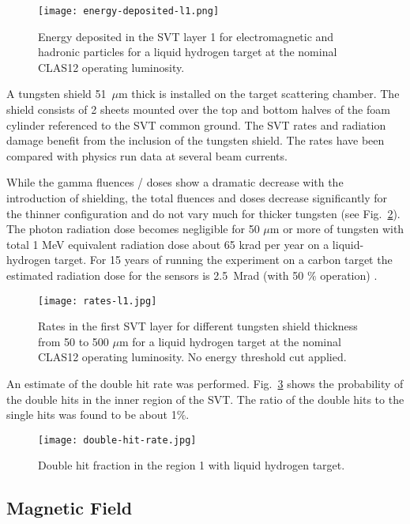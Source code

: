 \begin{figure}[hbt] 
\centering 
\texttt{[image: energy-deposited-l1.png]}
\caption{Energy deposited in the SVT layer 1 for electromagnetic and hadronic particles for a liquid hydrogen target at the nominal CLAS12 operating luminosity.}
\label{fig:energy-deposited-l1}
\end{figure}

A tungsten shield 51~$\mu$m thick is installed on the target scattering chamber. The shield consists of 2 sheets mounted over the top and bottom halves of the foam cylinder referenced to the SVT common ground. The SVT rates and radiation damage benefit from the inclusion of the tungsten shield. The rates have been compared with physics run data at several beam currents.

While the gamma fluences / doses show a dramatic decrease with the introduction of shielding, the total fluences and doses decrease significantly for the thinner configuration and do not vary much for thicker tungsten (see Fig.~\ref{fig:rates-l1}). The photon radiation dose becomes negligible for 50 $\mu$m or more of tungsten with total 1 MeV equivalent radiation dose about 65 krad per year on a liquid-hydrogen target. For 15 years of running the experiment on a carbon target the estimated radiation dose for the sensors is 2.5~Mrad (with 50 $\%$ operation) \cite{TDRSVT}. 

\begin{figure}[hbt] 
\centering 
\texttt{[image: rates-l1.jpg]}
\caption{Rates in the first SVT layer for different tungsten shield thickness from 50 to 500 $\mu$m for a liquid hydrogen target at the nominal CLAS12 operating luminosity. No energy threshold cut applied.}
\label{fig:rates-l1}
\end{figure}

An estimate of the double hit rate was performed. Fig.~\ref{fig:double-hit-rate} shows the probability of the double hits in the inner region of the SVT. The ratio of the double hits to the single hits was found to be about 1$\%$.

\begin{figure}[hbt] 
\centering 
\texttt{[image: double-hit-rate.jpg]}
\caption{Double hit fraction in the region 1 with liquid hydrogen target.}
\label{fig:double-hit-rate}
\end{figure}

\subsection{Magnetic Field}

